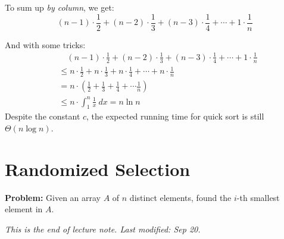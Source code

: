 \documentclass[11pt, a4paper]{COMP3711}
\begin{document}
\begin{spacing}{1.5}
    To sum up {\it by column}, we get: 
    $$(n-1)\cdot \frac{1}{2}+(n-2)\cdot \frac{1}{3}+
    (n-3)\cdot \frac{1}{4}+\cdots +1\cdot \frac{1}{n}$$

    And with some tricks: 
    \begin{align*}
        &\quad (n-1)\cdot \frac{1}{2}+(n-2)\cdot \frac{1}{3}+
        (n-3)\cdot \frac{1}{4}+\cdots +1\cdot \frac{1}{n}\\
        &\le n\cdot \frac{1}{2}+n\cdot \frac{1}{3}+
        n\cdot \frac{1}{4}+\cdots +n\cdot \frac{1}{n}\\
        &= n\cdot \left(\frac{1}{2}+\frac{1}{3}+
        \frac{1}{4}+\cdots \frac{1}{n} \right)\\
        &\le n\cdot \int_1^{n} \frac{1}{x}\ dx= n\ln n
    \end{align*}
    Despite the constant $c$, the expected running time 
    for quick sort is still $\Theta(n\log n)$.

    \section{Randomized Selection}

    {\bf Problem: }Given an array $A$ of $n$ distinct 
    elements, found the $i$-th smallest element in $A$.


    \vspace{0.5in}
    {\it This is the end of lecture note. Last modified: Sep 20.}


\end{spacing}
\end{document}
